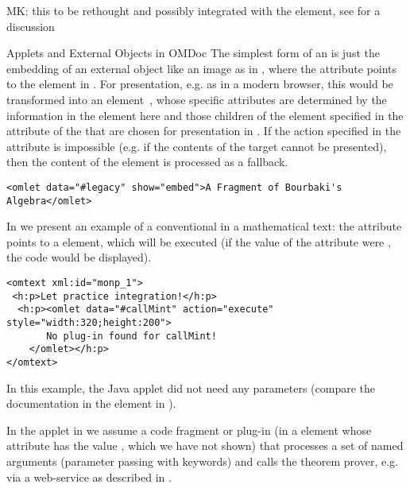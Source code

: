 \begin{module}[id=ext]
\begin{omgroup}[id=ext,short=Auxiliary Elements]
\begin{oldpart}{MK: this to be rethought and possibly integrated with the
    {} element, see  for a discussion}
\begin{omgroup}[id=applets]{Applets and External Objects in OMDoc}
The simplest form of an {} is just the embedding of an external object like
an image as in {}, where the {} attribute
points to the {} element in {}. For presentation,
e.g. as {\xhtml} in a modern browser, this would be transformed into an
{} element~\cite{W3C:xhtml2000}, whose specific attributes
are determined by the information in the {} element here and those
{} children of the {} element specified in the
{} attribute of the {} that are chosen for
presentation in {\xhtml}. If the action specified in the {}
attribute is impossible (e.g. if the contents of the {} target
cannot be presented), then the content of the {} element is processed as a
fallback.

\begin{lstlisting}[label=lst:omlet-image,
  caption={An {\element{omlet}} for an Image},index={omlet}]
<omlet data="#legacy" show="embed">A Fragment of Bourbaki's Algebra</omlet>
\end{lstlisting}

In {} we present an example of a conventional
{} in a mathematical text: the {}
attribute points to a {} element, which will be executed (if the
value of the {} attribute were
{}, the code would be displayed).

\begin{lstlisting}[label=lst:omlet1,
  caption={An {\element{omlet}} that Calls the Java Applet from {\mylstref{callMint}}.},
  index={omlet}]
<omtext xml:id="monp_1">    
 <h:p>Let practice integration!</h:p>
  <h:p><omlet data="#callMint" action="execute" style="width:320;height:200">
       No plug-in found for callMint!
    </omlet></h:p>
</omtext>
\end{lstlisting}

In this example, the Java applet did not need any parameters (compare the
documentation in the {} element in {}). 

In the applet in {} we assume a code fragment or plug-in (in a
{} element whose {} attribute has the value
{}, which we have not shown) that processes a set of named arguments
(parameter passing with keywords) and calls the theorem prover, e.g. via a web-service as
described in {}.


\end{omgroup}
\end{oldpart}
\end{omgroup}
\end{module}
